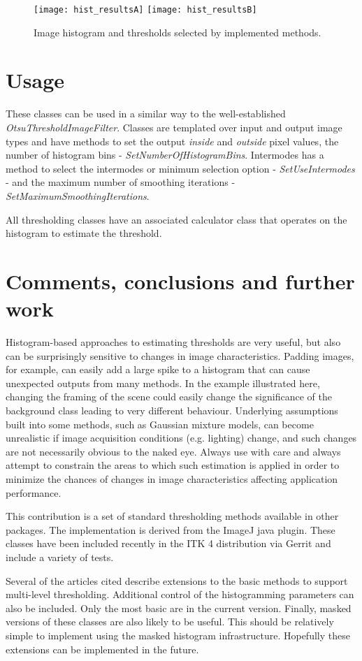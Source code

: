 \documentclass{InsightArticle}
\begin{document}
\begin{figure}[htbp]
\centering
\texttt{[image: hist\_resultsA]}
\texttt{[image: hist\_resultsB]}
\caption{Image histogram and thresholds selected by implemented methods.\label{fig:thresh}}
\end{figure}


\section{Usage}
These classes can be used in a similar way to the well-established
{\em OtsuThresholdImageFilter}. Classes are templated over input and
output image types and have methods to set the output {\em inside} and
{\em outside} pixel values, the number of histogram bins - {\em
  SetNumberOfHistogramBins}. Intermodes has a method to select the
intermodes or minimum selection option - {\em SetUseIntermodes} - and
the maximum number of smoothing iterations - {\em
  SetMaximumSmoothingIterations}.

All thresholding classes have an associated calculator class that
operates on the histogram to estimate the threshold. 

\section{Comments, conclusions and further work}
Histogram-based approaches to estimating thresholds are very useful, but also can be surprisingly sensitive to changes in image characteristics. Padding images, for example, can easily add a large spike to a histogram that can cause unexpected outputs from many methods. In the example illustrated here, changing the framing of the scene could easily change the significance of the background class leading to very different behaviour. Underlying assumptions built into some methods, such as Gaussian mixture models, can become unrealistic if image acquisition conditions (e.g. lighting) change, and such changes are not necessarily obvious to the naked eye. Always use with care and always attempt to constrain the areas to which such estimation is applied in order to minimize the chances of changes in image characteristics affecting application performance.

This contribution is a set of standard thresholding methods available in other packages. The implementation is derived from the ImageJ java plugin. These classes have been included recently in the ITK 4 distribution via Gerrit and include a variety of tests.

Several of the articles cited describe extensions to the basic methods to support multi-level thresholding. Additional control of the histogramming parameters can also be included. Only the most basic are in the current version. Finally, masked versions of these classes are also likely to be useful. This should be relatively simple to implement using the masked histogram infrastructure. Hopefully these extensions can be implemented in the future.

\appendix





\nocite{ITKSoftwareGuide}
\end{document}
